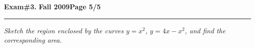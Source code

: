 \documentclass[12pt]{article}
\begin{document}
\hfill{\large\bf Exam\#3.}\hfill{\large\bf
  Fall 2009}\hfill{\large\bf Page 5/5}\hrule

\bigskip
{\problem[25 pts] \em Sketch the region enclosed by the curves
  $y=x^2$, $y=4x-x^2$, and find the corresponding area.}
\vspace{20cm}
\begin{flushright}
\end{flushright}
\end{document}
